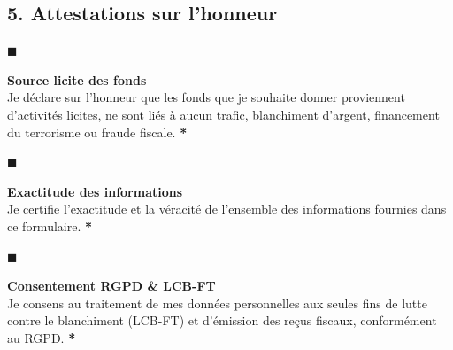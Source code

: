 \documentclass[12pt, a4paper]{article}
\newcommand{\checkSquareFilled}{\textcolor{ethicGold}{\textbf{$\blacksquare$}}}
\newcommand{\required}{\textcolor{redalert}{\textbf{*}}}
\begin{document}
\begin{sectionbox}
    \subsection*{5.  Attestations sur l'honneur}
    
    \vspace{0.3cm}
    
    \noindent
    \begin{minipage}[t]{0.05\textwidth}
        \checkSquareFilled
    \end{minipage}%
    \begin{minipage}[t]{0.93\textwidth}
        \textbf{Source licite des fonds} \\
        Je déclare sur l'honneur que les fonds que je souhaite donner proviennent d'activités licites, ne sont liés à aucun trafic, blanchiment d'argent, financement du terrorisme ou fraude fiscale. \required
    \end{minipage}
    
    \vspace{0.3cm}
    
    \noindent
    \begin{minipage}[t]{0.05\textwidth}
        \checkSquareFilled
    \end{minipage}%
    \begin{minipage}[t]{0.93\textwidth}
        \textbf{Exactitude des informations} \\
        Je certifie l'exactitude et la véracité de l'ensemble des informations fournies dans ce formulaire. \required
    \end{minipage}
    
    \vspace{0.3cm}
    
    \noindent
    \begin{minipage}[t]{0.05\textwidth}
        \checkSquareFilled
    \end{minipage}%
    \begin{minipage}[t]{0.93\textwidth}
        \textbf{Consentement RGPD \& LCB-FT} \\
        Je consens au traitement de mes données personnelles aux seules fins de lutte contre le blanchiment (LCB-FT) et d'émission des reçus fiscaux, conformément au RGPD. \required
    \end{minipage}
    

\end{sectionbox}
\end{document}
